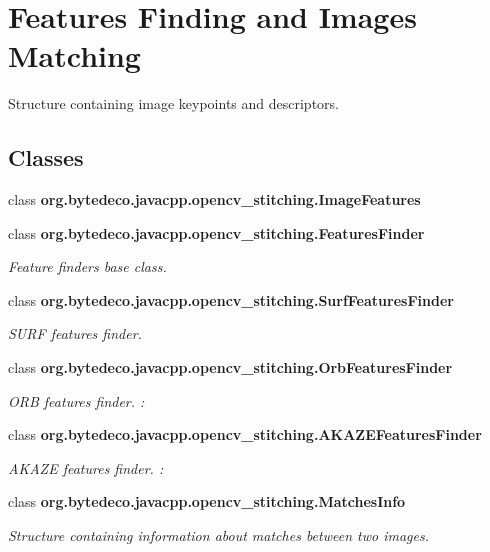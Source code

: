\hypertarget{group__stitching__match}{}\section{Features Finding and Images Matching}
\label{group__stitching__match}


Structure containing image keypoints and descriptors.  


\subsection*{Classes}
\begin{DoxyCompactItemize}
\item 
class {\bfseries org.\+bytedeco.\+javacpp.\+opencv\+\_\+stitching.\+Image\+Features}
\item 
class {\bfseries org.\+bytedeco.\+javacpp.\+opencv\+\_\+stitching.\+Features\+Finder}
\begin{DoxyCompactList}\small\item\em Feature finders base class. \end{DoxyCompactList}\item 
class {\bfseries org.\+bytedeco.\+javacpp.\+opencv\+\_\+stitching.\+Surf\+Features\+Finder}
\begin{DoxyCompactList}\small\item\em S\+U\+RF features finder. \end{DoxyCompactList}\item 
class {\bfseries org.\+bytedeco.\+javacpp.\+opencv\+\_\+stitching.\+Orb\+Features\+Finder}
\begin{DoxyCompactList}\small\item\em O\+RB features finder. \+: \end{DoxyCompactList}\item 
class {\bfseries org.\+bytedeco.\+javacpp.\+opencv\+\_\+stitching.\+A\+K\+A\+Z\+E\+Features\+Finder}
\begin{DoxyCompactList}\small\item\em A\+K\+A\+ZE features finder. \+: \end{DoxyCompactList}\item 
class {\bfseries org.\+bytedeco.\+javacpp.\+opencv\+\_\+stitching.\+Matches\+Info}
\begin{DoxyCompactList}\small\item\em Structure containing information about matches between two images. \end{DoxyCompactList}\item 

\end{DoxyCompactItemize}
